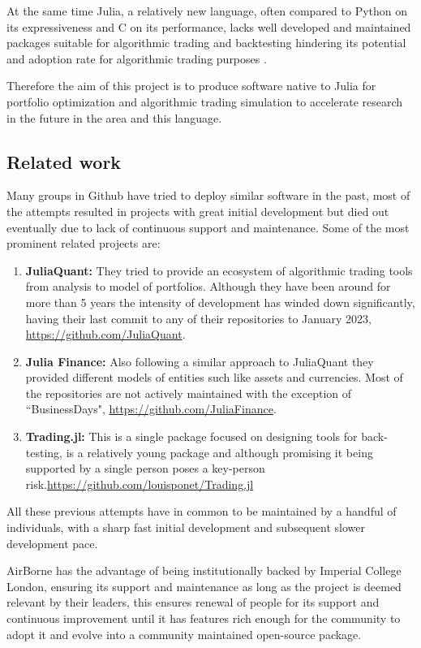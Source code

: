 At the same time Julia, a relatively new language, often compared to Python on its expressiveness and C on its performance, lacks well developed and maintained packages suitable for algorithmic trading and backtesting hindering its potential and adoption rate for algorithmic trading purposes \cite{juliaReview2021}. 

Therefore the aim of this project is to produce software native to Julia for portfolio optimization and algorithmic trading simulation to accelerate research in the future in the area and this language. 

\subsection{Related work}

Many groups in Github have tried to deploy similar software in the past, most of the attempts resulted in projects with great initial development but died out eventually due to lack of continuous support and maintenance. Some of the most prominent related projects are:

\begin{enumerate}
    \item \textbf{JuliaQuant:} They tried to provide an ecosystem of algorithmic trading tools from analysis to model of portfolios. Although they have been around for more than 5 years the intensity of development has winded down significantly, having their last commit to any of their repositories to January 2023, \url{https://github.com/JuliaQuant}. 
    \item \textbf{Julia Finance:} Also following a similar approach to JuliaQuant they provided different models of entities such like assets and currencies. Most of the repositories are not actively maintained with the exception of ``BusinessDays", \url{https://github.com/JuliaFinance}.
    \item \textbf{Trading.jl:} This is a single package focused on designing tools for back-testing, is a relatively young package and although promising it being supported by a single person poses a key-person risk.\url{https://github.com/louisponet/Trading.jl}
\end{enumerate}

All these previous attempts have in common to be maintained by a handful of individuals, with a sharp fast initial development and subsequent slower development pace. 

AirBorne has the advantage of being institutionally backed by Imperial College London, ensuring its support and maintenance as long as the project is deemed relevant by their leaders, this ensures renewal of people for its support and continuous improvement until it has features rich enough for the community to adopt it and evolve into a community maintained open-source package.

